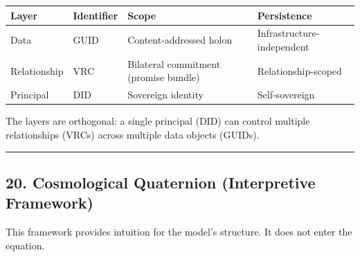 \documentclass[
]{article}
\newcounter{none} %
\begin{document}
{\def\LTcaptype{none} %
\begin{longtable}[]{@{}
  >{\raggedright\arraybackslash}p{}
  >{\raggedright\arraybackslash}p{}
  >{\raggedright\arraybackslash}p{}
  >{\raggedright\arraybackslash}p{}@{}}
\toprule\noalign{}
\begin{minipage}[b]{\linewidth}\raggedright
Layer
\end{minipage} & \begin{minipage}[b]{\linewidth}\raggedright
Identifier
\end{minipage} & \begin{minipage}[b]{\linewidth}\raggedright
Scope
\end{minipage} & \begin{minipage}[b]{\linewidth}\raggedright
Persistence
\end{minipage} \\
\midrule\noalign{}
\endhead
\bottomrule\noalign{}
\endlastfoot
Data & GUID & Content-addressed holon & Infrastructure-independent \\
Relationship & VRC & Bilateral commitment (promise bundle) &
Relationship-scoped \\
Principal & DID & Sovereign identity & Self-sovereign \\
\end{longtable}
}

The layers are orthogonal: a single principal (DID) can control multiple
relationships (VRCs) across multiple data objects (GUIDs).

\begin{center}\rule{0.5\linewidth}{0.5pt}\end{center}

\subsection{20. Cosmological Quaternion (Interpretive
Framework)}\label{cosmological-quaternion-interpretive-framework}

This framework provides intuition for the model's structure. It does not
enter the equation.
\end{document}

